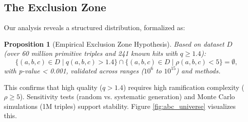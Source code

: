 \documentclass[11pt,a4paper]{article}
\newtheorem{proposition}{Proposition}[section]
\begin{document}
\subsection{The Exclusion Zone}
Our analysis reveals a structured distribution, formalized as:

\begin{proposition}[Empirical Exclusion Zone Hypothesis]
Based on dataset \(D\) (over 60 million primitive triples and 241 known hits with \(q \geq 1.4\)):
\[
\{ (a,b,c) \in D \mid q(a,b,c) > 1.4 \} \cap \{ (a,b,c) \in D \mid \rho(a,b,c) < 5 \} = \emptyset,
\]
with p-value < 0.001, validated across ranges (\(10^6\) to \(10^{15}\)) and methods.
\end{proposition}

This confirms that high quality (\(q > 1.4\)) requires high ramification complexity (\(\rho \geq 5\)). Sensitivity tests (random vs. systematic generation) and Monte Carlo simulations (1M triples) support stability. Figure \ref{fig:abc_universe} visualizes this.
\end{document}
